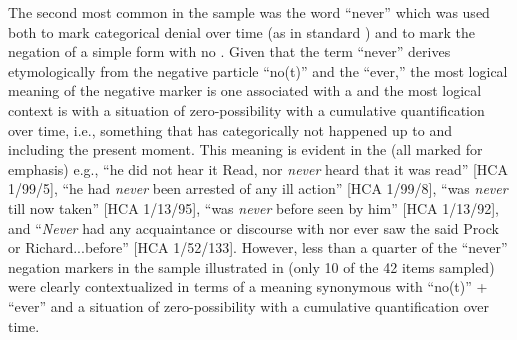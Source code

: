 The second most common  in the sample was the word “never” which was used both to mark categorical denial over time (as in standard ) and to mark the negation of a simple  form with no . Given that the term “never” derives etymologically from the negative particle “no(t)” and the  “ever,” the most logical meaning of the negative marker is one associated with a  and the most logical context is with a situation of zero-possibility with a cumulative quantification over time, i.e., something that has categorically not happened up to and including the present moment. This meaning is evident in the  (all marked for emphasis) e.g., “he did not hear it Read, nor \textit{never} heard that it was read” [HCA 1/99/5], “he had \textit{never} been arrested of any ill action” [HCA 1/99/8], “was \textit{never} till now taken” [HCA 1/13/95], “was \textit{never} before seen by him” [HCA 1/13/92], and “\textit{Never} had any acquaintance or discourse with nor ever saw the said Prock or Richard...before” [HCA 1/52/133]. However, less than a quarter of the “never” negation markers in the sample illustrated in  (only 10 of the 42 items sampled) were clearly contextualized in terms of a meaning synonymous with “no(t)” + “ever” and a situation of zero-possibility with a cumulative quantification over time. 

